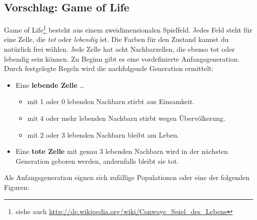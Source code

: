 \subsection*{Vorschlag: Game of Life}
\glqq{}Game of Life\grqq{}\footnote{siehe auch \url{http://de.wikipedia.org/wiki/Conways_Spiel_des_Lebens}} besteht aus einem zweidimensionalen Spielfeld.
Jedes Feld steht für eine Zelle, die \textit{tot} oder \textit{lebendig} ist. Die Farben für den Zustand kannst du natürlich frei wählen.
Jede Zelle hat acht Nachbarzellen, die ebenso tot oder lebendig sein können.
Zu Beginn gibt es eine vordefinierte Anfangsgeneration.
Durch festgelegte Regeln wird die nachfolgende Generation ermittelt:
\begin{itemize}
	\item Eine \textbf{lebende Zelle} \dots
	\begin{itemize}
		\item mit 1 oder 0 lebenden Nachbarn stirbt aus Einsamkeit.
		\item mit 4 oder mehr lebenden Nachbarn stirbt wegen Übervölkerung.
		\item mit 2 oder 3 lebenden Nachbarn bleibt am Leben.
	\end{itemize}
	\item Eine \textbf{tote Zelle} mit genau 3 lebenden Nachbarn wird in der nächsten Generation geboren werden, andernfalls bleibt sie tot.
\end{itemize}
%
Als Anfangsgeneration eignen sich zufällige Populationen oder eine der folgenden Figuren:
